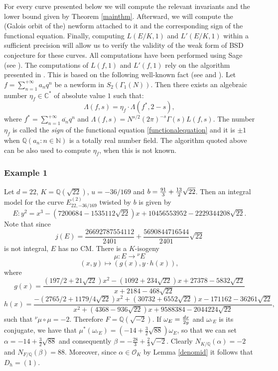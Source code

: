 \documentclass[11pt]{amsart}
\theoremstyle{definition}
\begin{document}
		For every curve presented below we will compute the relevant invariants and the lower bound given  by Theorem \ref{mainthm}. Afterward, we will compute the (Galois orbit of the) newform attached to it and the corresponding sign of the functional equation. Finally, computing $L(E/K,1)$ and $L'(E/K,1)$ within a sufficient precision will allow us to verify the validity of the weak form of BSD conjecture for these curves. All computations have been performed using Sage (see \cite{sage}). The computations of $L(f,1)$ and $L'(f,1)$ rely on the algorithm presented in \cite{dokL}. This is based on the following well-known fact (see \cite{dis} and \cite{atkli}). Let $\displaystyle f=\sum_{n=1}^{+\infty}a_nq^n$ be a newform in $S_2(\Gamma_1(N))$. Then there exists an algebraic number $\eta_f\in {\mathbb{C}}^*$ of absolute value $1$ such that:
		\begin{equation}\label{functionalequation}
			\Lambda(f,s)=\eta_f\cdot\Lambda(f^*,2-s),
		\end{equation}
		where $\displaystyle f^*=\sum_{n=1}^{+\infty}\overline{a_n}q^n$ and $\Lambda(f,s)=N^{s/2}(2\pi)^{-s}\Gamma(s)L(f,s)$. The number $\eta_f$ is called the \emph{sign} of the functional equation \eqref{functionalequation} and it is $\pm 1$ when ${\mathbb{Q}}(a_n\colon n\in {\mathbb{N}})$ is a totally real number field. The algorithm quoted above can be also used to compute $\eta_f$, when this is not known.

		\subsubsection*{Example 1}
		Let $d=22$, $K={\mathbb{Q}}(\sqrt{22})$, $u=-36/169$ and ${\displaystyle} b=\frac{91}{3}+\frac{13}{2}\sqrt{22}$. Then an integral model for the curve $E_{22,-36/169}^{(2)}$ twisted by $b$ is given by
		$$E\colon y^2 = x^3 - (7200684-1535112\sqrt{22})x +10456553952-2229344208\sqrt{22}.$$
		Note that since
		$$j(E)=\frac{26692787554112}{2401}+\frac{5690844716544}{2401}\sqrt{22}$$
		is not integral, $E$ has no CM. There is a $K$-isogeny
		$$\mu\colon E\to {{}^\nu\!} E$$
		$$(x,y)\mapsto (g(x),y\cdot h(x)),$$
		where
		$$g(x)=\frac{(197/2+21\sqrt{22})x^2 -(1092+234\sqrt{22})x + 27378-5832\sqrt{22}}{x  + 2184-468\sqrt{22}}$$
		$$h(x)=\frac{-(2765/2+1179/4\sqrt{22})x^2 + (30732+6552\sqrt{22})x - 171162-36261\sqrt{22}}{x^2 + (4368-936\sqrt{22})x + 9588384-2044224\sqrt{22}},$$
		such that ${{}^\nu\!}\mu\circ\mu=-2$. Therefore $F={\mathbb{Q}}(\sqrt{-2})$. If ${\displaystyle}\omega_{E}=\frac{dx}{2y}$ and $\omega_{{{}^\nu\!} E}$ is its conjugate, we have that $\mu^*(\omega_{{{}^\nu\!} E})=(-14+\frac{3}{2}\sqrt{88})\omega_E$, so that we can set $\alpha=-14+\frac{3}{2}\sqrt{88}$ and consequently $\beta=-\frac{28}{3}+\frac{2}{3}\sqrt{-2}$. Clearly $N_{K/{\mathbb{Q}}}(\alpha)=-2$ and $N_{F/{\mathbb{Q}}}(\beta)=88$. Moreover, since $\alpha\in {\mathcal{O}}_K$ by Lemma \ref{denomid} it follows that $D_h=(1)$.
\end{document}
